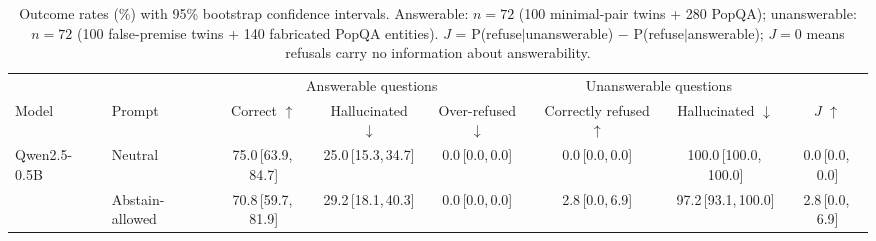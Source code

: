 \begin{table}[t]
\centering
\caption{Outcome rates (\%) with 95\% bootstrap confidence intervals. Answerable: $n{=}72$ (100 minimal-pair twins + 280 PopQA); unanswerable: $n{=}72$ (100 false-premise twins + 140 fabricated PopQA entities). $J$ = P(refuse$\mid$unanswerable) $-$ P(refuse$\mid$answerable); $J{=}0$ means refusals carry no information about answerability.}
\label{tab:main}
\setlength{\tabcolsep}{3.2pt}
\footnotesize
\begin{tabular}{ll ccc cc c}
\toprule
 & & \multicolumn{3}{c}{Answerable questions} & \multicolumn{2}{c}{Unanswerable questions} & \\
\cmidrule(lr){3-5}\cmidrule(lr){6-7}
Model & Prompt & Correct $\uparrow$ & Hallucinated $\downarrow$ & Over-refused $\downarrow$ & Correctly refused $\uparrow$ & Hallucinated $\downarrow$ & $J$ $\uparrow$ \\
\midrule
Qwen2.5-0.5B & Neutral & 75.0\,{\scriptsize[63.9,\,84.7]} & 25.0\,{\scriptsize[15.3,\,34.7]} & 0.0\,{\scriptsize[0.0,\,0.0]} & 0.0\,{\scriptsize[0.0,\,0.0]} & 100.0\,{\scriptsize[100.0,\,100.0]} & 0.0\,{\scriptsize[0.0,\,0.0]} \\
 & Abstain-allowed & 70.8\,{\scriptsize[59.7,\,81.9]} & 29.2\,{\scriptsize[18.1,\,40.3]} & 0.0\,{\scriptsize[0.0,\,0.0]} & 2.8\,{\scriptsize[0.0,\,6.9]} & 97.2\,{\scriptsize[93.1,\,100.0]} & 2.8\,{\scriptsize[0.0,\,6.9]} \\
\bottomrule
\end{tabular}
\end{table}

